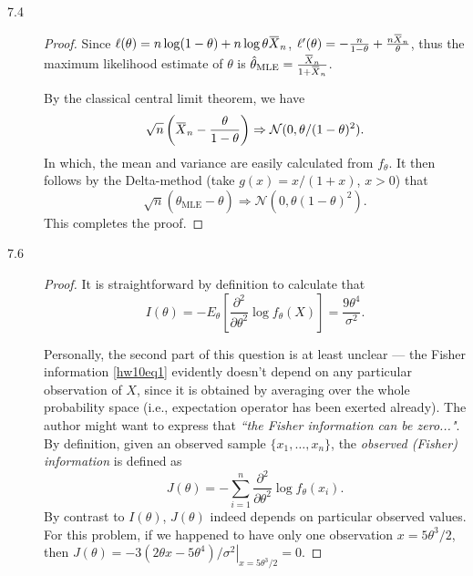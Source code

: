 \documentclass{article}
\newcommand{\overbar}[1]{\mkern 1.5mu\overline{\mkern-1.5mu#1\mkern-1.5mu}\mkern 1.5mu}
\newcommand{\gaussian}{\mathcal{N}}
\theoremstyle{definition}
\theoremstyle{plain}
\theoremstyle{remark}
\begin{document}
\begin{description}
\item[7.4]
\begin{proof}
Since $\ell(\theta) = n\log(1 - \theta) + n\log\theta\overbar{X}_n$, 
$\ell'(\theta) = -\frac{n}{1 - \theta} + \frac{n\overbar{X}_n}{\theta}$, thus
the maximum likelihood estimate of $\theta$ is $\hat{\theta}_{\text{MLE}} = 
\frac{\overbar{X}_n}{1 + \overbar{X}_n}$.

By the classical central limit theorem, we have
\begin{equation*}
    \sqrt{n}\left(\overbar{X}_n - \frac{\theta}{1 - \theta}\right)
    \Rightarrow \gaussian(0, \theta/(1 - \theta)^2).
\end{equation*}
In which, the mean and variance are easily calculated from $f_\theta$. It
then follows by the Delta-method (take $g(x) = x/(1 + x)$, $x > 0$) that
$$\sqrt{n}(\hat{\theta}_{\text{MLE}} - \theta) \Rightarrow \gaussian(0, 
\theta(1 - \theta)^2).$$ 
This completes the proof.
\end{proof}

\item[7.6]
\begin{proof}
It is straightforward by definition to calculate that 
\begin{equation}\label{hw10eq1}
    I(\theta) = -E_\theta\left[\frac{\partial^2}{\partial \theta^2} \log f_\theta(X) \right] = \frac{9\theta^4}{\sigma^2}.
\end{equation}

Personally, the second part of this question is at least unclear --- the Fisher 
information \eqref{hw10eq1} evidently doesn't depend on any particular observation of
$X$, since it is obtained by averaging over the whole probability space (i.e., 
expectation operator has been exerted already). The author might want to express that
\emph{``the {\color{red}{observed}} Fisher information can be zero..."}. By definition,
given an observed sample $\{x_1, \ldots, x_n\}$, the \emph{observed (Fisher)
information} is defined as 
$$J(\theta) = -\sum_{i = 1}^n \frac{\partial^2}{\partial \theta^2} \log f_\theta(x_i).$$
By contrast to $I(\theta)$, $J(\theta)$ indeed depends on particular observed values. 
For this problem, if we happened to have only one observation $x = 5\theta^3/2$, then
$J(\theta) = \left.-3(2\theta x - 5\theta^4)/\sigma^2\right|_{x = 5\theta^3/2} = 0$. 
\end{proof} 


\end{description}
\end{document}
